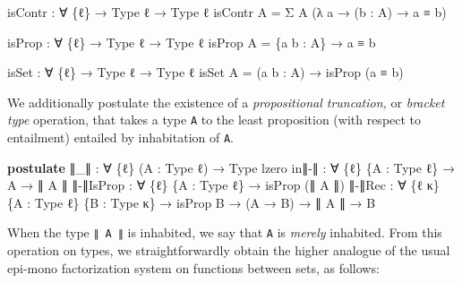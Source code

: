 \documentclass[
  11pt,
  oneside,
  article]{memoir}
\newenvironment{Shaded}{}{}
\newcommand{\KeywordTok}[1]{\textcolor[rgb]{0.00,0.44,0.13}{\textbf{#1}}}
\newcommand{\NormalTok}[1]{#1}
\newcommand{\OtherTok}[1]{\textcolor[rgb]{0.00,0.44,0.13}{#1}}
\theoremstyle{definition}
\theoremstyle{plain}
\newcommand{\0}{\textsf{0}}
\newcommand{\1}{\tn{\textsf{1}}}
\begin{document}
\begin{Shaded}
\begin{Highlighting}[]
\NormalTok{isContr }\OtherTok{:} \OtherTok{∀} \OtherTok{\{}\NormalTok{ℓ}\OtherTok{\}} \OtherTok{→}\NormalTok{ Type ℓ }\OtherTok{→}\NormalTok{ Type ℓ}
\NormalTok{isContr A }\OtherTok{=}\NormalTok{ Σ A }\OtherTok{(λ}\NormalTok{ a }\OtherTok{→} \OtherTok{(}\NormalTok{b }\OtherTok{:}\NormalTok{ A}\OtherTok{)} \OtherTok{→}\NormalTok{ a ≡ b}\OtherTok{)}

\NormalTok{isProp }\OtherTok{:} \OtherTok{∀} \OtherTok{\{}\NormalTok{ℓ}\OtherTok{\}} \OtherTok{→}\NormalTok{ Type ℓ }\OtherTok{→}\NormalTok{ Type ℓ}
\NormalTok{isProp A }\OtherTok{=} \OtherTok{\{}\NormalTok{a b }\OtherTok{:}\NormalTok{ A}\OtherTok{\}} \OtherTok{→}\NormalTok{ a ≡ b}

\NormalTok{isSet }\OtherTok{:} \OtherTok{∀} \OtherTok{\{}\NormalTok{ℓ}\OtherTok{\}} \OtherTok{→}\NormalTok{ Type ℓ }\OtherTok{→}\NormalTok{ Type ℓ}
\NormalTok{isSet A }\OtherTok{=} \OtherTok{(}\NormalTok{a b }\OtherTok{:}\NormalTok{ A}\OtherTok{)} \OtherTok{→}\NormalTok{ isProp }\OtherTok{(}\NormalTok{a ≡ b}\OtherTok{)}
\end{Highlighting}
\end{Shaded}

We additionally postulate the existence of a \emph{propositional
truncation,} or \emph{bracket type} operation, that takes a type
\texttt{A} to the least proposition (with respect to entailment) entailed by
inhabitation of \texttt{A}.

\begin{Shaded}
\begin{Highlighting}[]
\KeywordTok{postulate}
\NormalTok{    ∥}\OtherTok{\_}\NormalTok{∥ }\OtherTok{:} \OtherTok{∀} \OtherTok{\{}\NormalTok{ℓ}\OtherTok{\}} \OtherTok{(}\NormalTok{A }\OtherTok{:}\NormalTok{ Type ℓ}\OtherTok{)} \OtherTok{→}\NormalTok{ Type lzero}
\NormalTok{    in∥{-}∥ }\OtherTok{:} \OtherTok{∀} \OtherTok{\{}\NormalTok{ℓ}\OtherTok{\}} \OtherTok{\{}\NormalTok{A }\OtherTok{:}\NormalTok{ Type ℓ}\OtherTok{\}} \OtherTok{→}\NormalTok{ A }\OtherTok{→}\NormalTok{ ∥ A ∥}
\NormalTok{    ∥{-}∥IsProp }\OtherTok{:} \OtherTok{∀} \OtherTok{\{}\NormalTok{ℓ}\OtherTok{\}} \OtherTok{\{}\NormalTok{A }\OtherTok{:}\NormalTok{ Type ℓ}\OtherTok{\}} \OtherTok{→}\NormalTok{ isProp }\OtherTok{(}\NormalTok{∥ A ∥}\OtherTok{)}
\NormalTok{    ∥{-}∥Rec }\OtherTok{:} \OtherTok{∀} \OtherTok{\{}\NormalTok{ℓ κ}\OtherTok{\}} \OtherTok{\{}\NormalTok{A }\OtherTok{:}\NormalTok{ Type ℓ}\OtherTok{\}} \OtherTok{\{}\NormalTok{B }\OtherTok{:}\NormalTok{ Type κ}\OtherTok{\}}
            \OtherTok{→}\NormalTok{ isProp B }\OtherTok{→} \OtherTok{(}\NormalTok{A }\OtherTok{→}\NormalTok{ B}\OtherTok{)} \OtherTok{→}\NormalTok{ ∥ A ∥ }\OtherTok{→}\NormalTok{ B}
\end{Highlighting}
\end{Shaded}
When the type \texttt{∥\ A\ ∥} is inhabited, we say that \texttt{A} is
\emph{merely} inhabited. From this operation on types, we straightforwardly obtain the higher
analogue of the usual epi-mono factorization system on functions between
sets, as follows:
\end{document}
